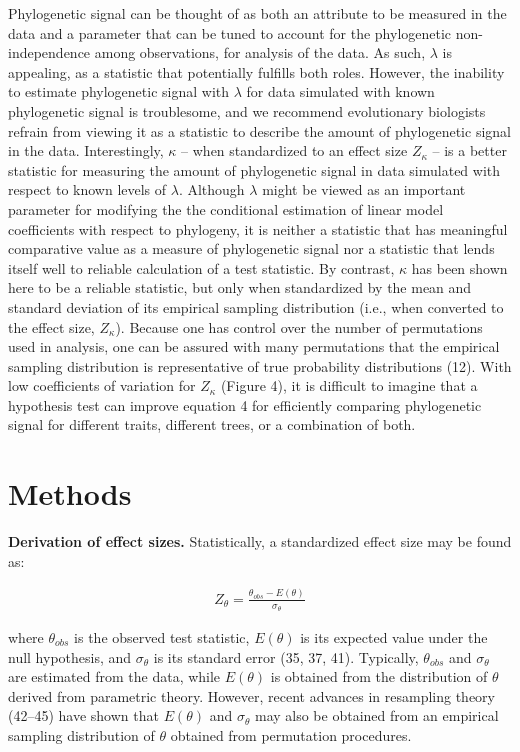 \documentclass[9pt,twocolumn,twoside,lineno]{pnas-new}
\begin{document}
Phylogenetic signal can be thought of as both an attribute to be
measured in the data and a parameter that can be tuned to account for
the phylogenetic non-independence among observations, for analysis of
the data. As such, \(\lambda\) is appealing, as a statistic that
potentially fulfills both roles. However, the inability to estimate
phylogenetic signal with \(\lambda\) for data simulated with known
phylogenetic signal is troublesome, and we recommend evolutionary
biologists refrain from viewing it as a statistic to describe the amount
of phylogenetic signal in the data. Interestingly, \(\kappa\) -- when
standardized to an effect size \(Z_\kappa\) -- is a better statistic for
measuring the amount of phylogenetic signal in data simulated with
respect to known levels of \(\lambda\). Although \(\lambda\) might be
viewed as an important parameter for modifying the the conditional
estimation of linear model coefficients with respect to phylogeny, it is
neither a statistic that has meaningful comparative value as a measure
of phylogenetic signal nor a statistic that lends itself well to
reliable calculation of a test statistic. By contrast, \(\kappa\) has
been shown here to be a reliable statistic, but only when standardized
by the mean and standard deviation of its empirical sampling
distribution (i.e., when converted to the effect size, \(Z_\kappa\)).
Because one has control over the number of permutations used in
analysis, one can be assured with many permutations that the empirical
sampling distribution is representative of true probability
distributions (12). With low coefficients of variation for \(Z_\kappa\)
(Figure 4), it is difficult to imagine that a hypothesis test can
improve equation 4 for efficiently comparing phylogenetic signal for
different traits, different trees, or a combination of both.

\hypertarget{methods}{%
\section{Methods}\label{methods}}

\textbf{Derivation of effect sizes.} Statistically, a standardized
effect size may be found as:

\begin{align}
    Z_{\theta}=\frac{\theta_{obs}-E(\theta)}{\sigma_\theta}
\end{align}

where \(\theta_{obs}\) is the observed test statistic, \(E(\theta)\) is
its expected value under the null hypothesis, and \(\sigma_\theta\) is
its standard error (35, 37, 41). Typically, \(\theta_{obs}\) and
\(\sigma_\theta\) are estimated from the data, while \(E(\theta)\) is
obtained from the distribution of \(\theta\) derived from parametric
theory. However, recent advances in resampling theory (42--45) have
shown that \(E(\theta)\) and \(\sigma_\theta\) may also be obtained from
an empirical sampling distribution of \(\theta\) obtained from
permutation procedures.
\end{document}
